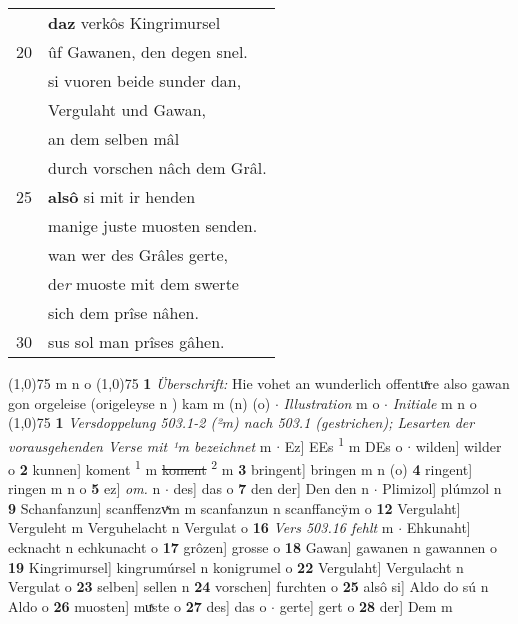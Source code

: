 \documentclass[8pt,a4paper,notitlepage]{article}
\begin{document}
\begin{table}[ht]
\begin{minipage}[t]{0.5\linewidth}
\begin{tabular}{rl}
 & \textbf{daz} verkôs Kingrimursel\\ 
20 & ûf Gawanen, den degen snel.\\ 
 & si vuoren beide sunder dan,\\ 
 & Vergulaht und Gawan,\\ 
 & an dem selben mâl\\ 
 & durch vorschen nâch dem Grâl.\\ 
25 & \textbf{alsô} si mit ir henden\\ 
 & manige juste muosten senden.\\ 
 & wan wer des Grâles gerte,\\ 
 & de\textit{r} muoste mit dem swerte\\ 
 & sich dem prîse nâhen.\\ 
30 & sus sol man prîses gâhen.\\ 
\end{tabular}
\scriptsize
\line(1,0){75} \newline
m n o \newline
\line(1,0){75} \newline
\textbf{1} \textit{Überschrift:} Hie vohet an wunderlich offentuͯre also gawan gon orgeleise (origeleyse n  ) kam m (n) (o)   $\cdot$ \textit{Illustration} m o   $\cdot$ \textit{Initiale} m n o  \newline
\line(1,0){75} \newline
\textbf{1} \textit{Versdoppelung 503.1-2 (²m) nach 503.1 (gestrichen); Lesarten der vorausgehenden Verse mit ¹m bezeichnet} m   $\cdot$ Ez] EEs \textsuperscript{1}\hspace{-1.3mm} m DEs o  $\cdot$ wilden] wilder o \textbf{2} kunnen] koment \textsuperscript{1}\hspace{-1.3mm} m \sout{koment} \textsuperscript{2}\hspace{-1.3mm} m \textbf{3} bringent] bringen m n (o) \textbf{4} ringent] ringen m n o \textbf{5} ez] \textit{om.} n  $\cdot$ des] das o \textbf{7} den der] Den den n  $\cdot$ Plimizol] plúmzol n \textbf{9} Schanfanzun] scanffenzvͯm m scanfanzun n scanffancÿm o \textbf{12} Vergulaht] Verguleht m Verguhelacht n Vergulat o \textbf{16} \textit{Vers 503.16 fehlt} m   $\cdot$ Ehkunaht] ecknacht n echkunacht o \textbf{17} grôzen] grosse o \textbf{18} Gawan] gawanen n gawannen o \textbf{19} Kingrimursel] kingrumúrsel n konigrumel o \textbf{22} Vergulaht] Vergulacht n Vergulat o \textbf{23} selben] sellen n \textbf{24} vorschen] furchten o \textbf{25} alsô si] Aldo do sú n Aldo o \textbf{26} muosten] muͯste o \textbf{27} des] das o  $\cdot$ gerte] gert o \textbf{28} der] Dem m \newline
\end{minipage}
\end{table}
\end{document}
